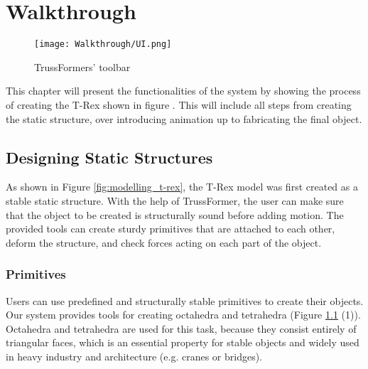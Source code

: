 
\chapter{Walkthrough}\label{ch:walkthrough}
\begin{figure}[h!]
    \texttt{[image: Walkthrough/UI.png]}
    \centering
    \caption{TrussFormers' toolbar}
    \label{fig:toolbar}
\end{figure}
This chapter will present the functionalities of the system by showing the process of creating the T-Rex shown in figure . This will include all steps from creating the static structure, over introducing animation up to fabricating the final object.

\section{Designing Static Structures}
As shown in Figure \ref{fig:modelling_t-rex}, the T-Rex model was first created as a stable static structure. With the help of TrussFormer, the user can make sure that the object to be created is structurally sound before adding motion. The provided tools can create sturdy primitives that are attached to each other, deform the structure, and check forces acting on each part of the object.

\subsection{Primitives}
Users can use predefined and structurally stable primitives to create their objects. Our system provides tools for creating octahedra and tetrahedra (Figure \ref{fig:toolbar} (1)). Octahedra and tetrahedra are used for this task, because they consist entirely of triangular faces, which is an essential property for stable objects and widely used in heavy industry and architecture (e.g. cranes or bridges).

